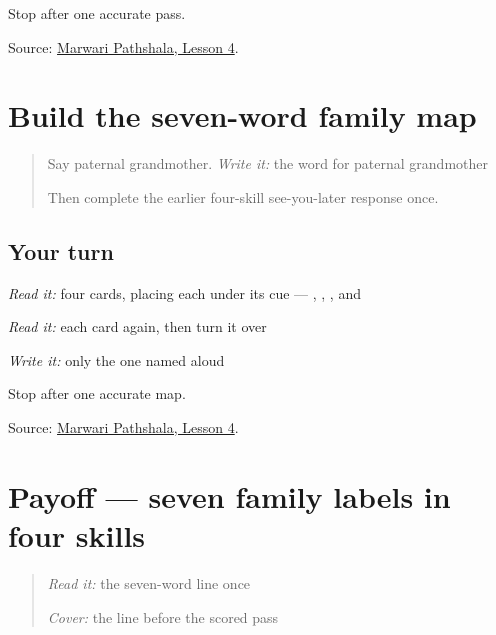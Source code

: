 \begin{tcolorbox}[breakable,colback=teal!4,colframe=teal!35!black,title={Before you move on}]
Stop after one accurate pass.

Source: \href{https://www.marwaripathshala.com/marwari-lesson-4-english}{Marwari Pathshala, Lesson 4}.
\end{tcolorbox}
\section[Practice]{Build the seven-word family map}

\label{lesson:MW-R08-family-map}



\begin{quote}
Say paternal grandmother. \emph{Write it:} the word for paternal grandmother

Then complete the earlier four-skill see-you-later response once.
\end{quote}

\subsection*{Your turn}
\emph{Read it:} four cards, placing each under its cue — \textbf{}, \textbf{}, \textbf{}, and \textbf{}

\emph{Read it:} each card again, then turn it over

\emph{Write it:} only the one named aloud

\begin{tcolorbox}[breakable,colback=teal!4,colframe=teal!35!black,title={Before you move on}]
Stop after one accurate map.

Source: \href{https://www.marwaripathshala.com/marwari-lesson-4-english}{Marwari Pathshala, Lesson 4}.
\end{tcolorbox}
\section[Practice]{Payoff — seven family labels in four skills}

\label{lesson:MW-C08-family-seven}



\begin{quote}
\emph{Read it:} the seven-word line once

\emph{Cover:} the line before the scored pass
\end{quote}

